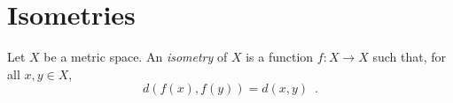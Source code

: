 \section{Isometries}

\begin{df}[Isometry]
  Let $X$ be a metric space. An \emph{isometry} of $X$ is a function $f : X
  \rightarrow X$ such that, for all $x, y \in X$,
  \[ d(f(x), f(y)) = d(x, y) \enspace . \]
\end{df}
